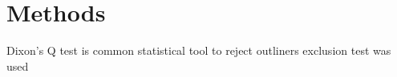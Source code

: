 \chapter{Methods}

Dixon's Q test is common statistical tool to reject outliners  exclusion test was used 
